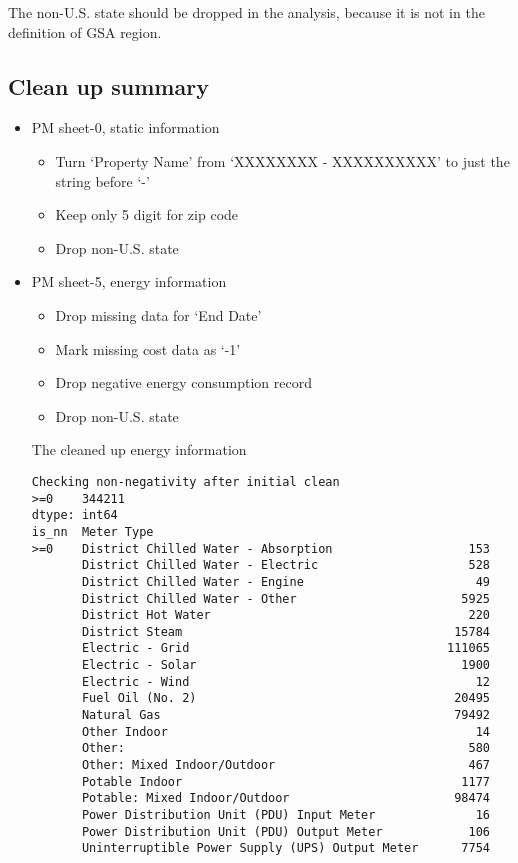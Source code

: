 \documentclass[12pt]{article}
\begin{document}
The non-U.S. state should be dropped in the analysis, because it is
not in the definition of GSA region. 

\pagebreak
\subsection{Clean up summary}
\begin{itemize}
\item PM sheet-0, static information
  \begin{itemize}
  \item Turn `Property Name' from `XXXXXXXX - XXXXXXXXXX' to just the
    string before `-'
  \item Keep only 5 digit for zip code
  \item Drop non-U.S. state
  \end{itemize}
\item PM sheet-5, energy information
  \begin{itemize}
  \item Drop missing data for `End Date'
  \item Mark missing cost data as `-1'
  \item Drop negative energy consumption record
  \item Drop non-U.S. state
  \end{itemize}
The cleaned up energy information
\begin{verbatim}
Checking non-negativity after initial clean
>=0    344211
dtype: int64
is_nn  Meter Type                                     
>=0    District Chilled Water - Absorption                   153
       District Chilled Water - Electric                     528
       District Chilled Water - Engine                        49
       District Chilled Water - Other                       5925
       District Hot Water                                    220
       District Steam                                      15784
       Electric - Grid                                    111065
       Electric - Solar                                     1900
       Electric - Wind                                        12
       Fuel Oil (No. 2)                                    20495
       Natural Gas                                         79492
       Other Indoor                                           14
       Other:                                                580
       Other: Mixed Indoor/Outdoor                           467
       Potable Indoor                                       1177
       Potable: Mixed Indoor/Outdoor                       98474
       Power Distribution Unit (PDU) Input Meter              16
       Power Distribution Unit (PDU) Output Meter            106
       Uninterruptible Power Supply (UPS) Output Meter      7754


\end{verbatim}
\end{itemize}
\end{document}

